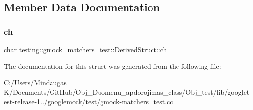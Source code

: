\subsection{Member Data Documentation}
\mbox{\label{structtesting_1_1gmock__matchers__test_1_1_derived_struct_abd7de960817b2c889f109ae6f2869f4c}} 
\subsubsection{\texorpdfstring{ch}{ch}}
{\footnotesize\ttfamily char testing\+::gmock\+\_\+matchers\+\_\+test\+::\+Derived\+Struct\+::ch}



The documentation for this struct was generated from the following file\+:\begin{DoxyCompactItemize}
\item 
C\+:/\+Users/\+Mindaugas K/\+Documents/\+Git\+Hub/\+Obj\+\_\+\+Duomenu\+\_\+apdorojimas\+\_\+class/\+Obj\+\_\+test/lib/googletest-\/release-\/1../googlemock/test/\mbox{\hyperlink{_obj__test_2lib_2googletest-release-1_88_81_2googlemock_2test_2gmock-matchers__test_8cc}{gmock-\/matchers\+\_\+test.\+cc}}\end{DoxyCompactItemize}

